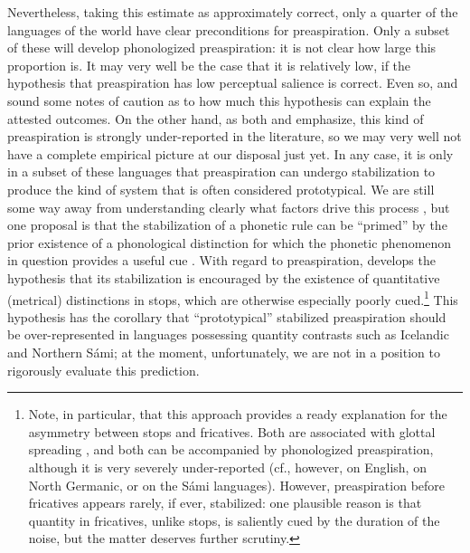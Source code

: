 \documentclass[output=paper,colorlinks,citecolor=brown]{langscibook}
\begin{document}
Nevertheless, taking this estimate as approximately correct, only a quarter of the languages of the world have clear preconditions for preaspiration. Only a subset of these will develop phonologized preaspiration: it is not clear how large this proportion is. It may very well be the case that it is relatively low, if the hypothesis that preaspiration has low perceptual salience \parencite{bladon1986phonetics, silverman03, blevins2017areal} is correct. Even so, \textcite{Clayton2010} and  sound some notes of caution as to how much this hypothesis can explain the attested outcomes. On the other hand, as both  and  emphasize, this kind of preaspiration is strongly under\hyp reported in the literature, so we may very well not have a complete empirical picture at our disposal just yet. In any case, it is only in a subset of these languages that preaspiration can undergo stabilization to produce the kind of system that is often considered prototypical. We are still some way away from understanding clearly what factors drive this process \parencite{sen2016examining, salmons2021sound}, but one proposal is that the stabilization of a phonetic rule can be \enquote{primed} by the prior existence of a phonological distinction for which the phonetic phenomenon in question provides a useful cue \parencite{kiparsky95}. With regard to preaspiration, \textcite{iosad2020phonological} develops the hypothesis that its stabilization is encouraged by the existence of quantitative (metrical) distinctions in stops, which are otherwise especially poorly cued.\footnote{Note, in particular, that this approach provides a ready explanation for the asymmetry between {\VOICELESS} stops and fricatives. Both are associated with glottal spreading \parencite{vaux-fricatives}, and both can be accompanied by phonologized preaspiration, although it is very severely under\hyp reported (cf., however, \citealt{hejná2015pre} on English, \citealt{allen2016laryngeal} on North Germanic, or \citealt[139--141]{bańczerowski1969konsonantenalternation} on the Sámi languages). However, preaspiration before fricatives appears rarely, if ever, stabilized: one plausible reason is that quantity in fricatives, unlike stops, is saliently cued by the duration of the noise, but the matter deserves further scrutiny.} This hypothesis has the corollary that \enquote{prototypical} stabilized preaspiration should be over\hyp represented in languages possessing quantity contrasts such as Icelandic and Northern Sámi; at the moment, unfortunately, we are not in a position to rigorously evaluate this prediction.
\end{document}
